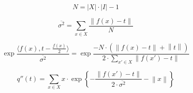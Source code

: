 \begin{equation*}
  N = \left| X \right| \cdot \left| I \right| - 1
\end{equation*}

\begin{equation*}
  \overline{\sigma^2}
  = \sum_{x \in X} \frac{\left\| f\left( x \right) - t \right\|}{N}
\end{equation*}

\begin{equation*}
  \exp{\frac{\langle f\left(x\right),
    t - \frac{f\left(x\right)}{2} \rangle}{\overline{\sigma^2}}}
  = \exp{\frac{-N \cdot \left( \left\| f\left( x \right) - t \right\| + \left\| t \right\| \right)}
              {2 \cdot \sum\limits_{x' \in X} \left\| f\left( x' \right) - t \right\|}}
\end{equation*}


\begin{equation*}
  q''\left( t \right)
  = \sum_{x \in X}
    x
    \cdot \exp{\left\{
      - \frac{\left\| f\left( x' \right) - t \right\|}{2 \cdot \overline{\sigma^2}}
      - \left\| x \right\| \right\}}
\end{equation*}
